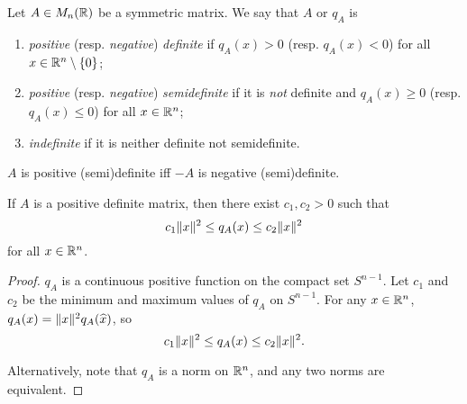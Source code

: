 \begin{definition}[definiteness] \label{def:definite}
    Let $A \in M_n(\mathbb{R})$ be a symmetric matrix.
    We say that $A$ or $q_A$ is
    \begin{enumerate}
        \item \emph{positive} (resp. \emph{negative}) \emph{definite}
            if $q_A(x) > 0$ (resp. $q_A(x) < 0$) for all
            $x \in \mathbb{R}^n \setminus \{0\}$;
        \item \emph{positive} (resp. \emph{negative}) \emph{semidefinite}
            if it is \emph{not} definite and $q_A(x) \ge 0$
            (resp. $q_A(x) \le 0$) for all $x \in \mathbb{R}^n$;
        \item \emph{indefinite} if it is neither definite not semidefinite.
    \end{enumerate}
\end{definition}
\begin{remark}
    $A$ is positive (semi)definite iff $-A$ is negative (semi)definite.
\end{remark}

\begin{proposition}
    If $A$ is a positive definite matrix, then there exist $c_1, c_2 > 0$
    such that \[
        c_1 \lVert x\rVert^2 \le q_A(x) \le c_2 \lVert x\rVert^2
    \] for all $x \in \mathbb{R}^n$.
\end{proposition}
\begin{proof}
    $q_A$ is a continuous positive function on the compact set $S^{n-1}$.
    Let $c_1$ and $c_2$ be the minimum and maximum values of $q_A$
    on $S^{n-1}$.
    For any $x \in \mathbb{R}^n$, $q_A(x) = \lVert x\rVert^2 q_A(\widehat{x})$, so \[
        c_1 \lVert x\rVert^2 \le q_A(x) \le c_2 \lVert x\rVert^2.
    \]

    Alternatively, note that $q_A$ is a norm on $\mathbb{R}^n$, and any two norms
    are equivalent.
\end{proof}
